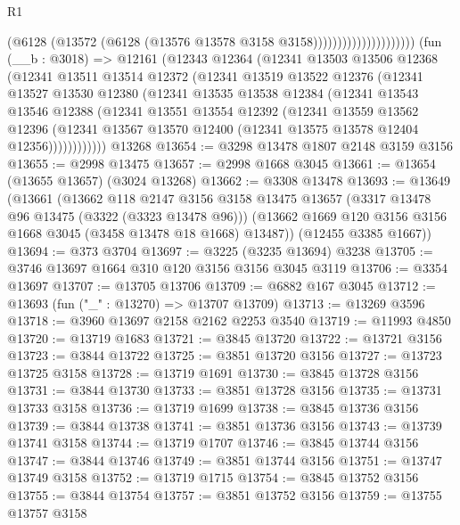 \begin{lexlean}{R1}
\begin{coremodule}
                                      (@6128
                                        (@13572
                                          (@6128 (@13576 @13578 @3158 @3158)))))))))))))))))))))
    (fun (__b : @3018) =>
    @12161
      (@12343
        @12364
        (@12341
          @13503
          @13506
          @12368
          (@12341
            @13511
            @13514
            @12372
            (@12341
              @13519
              @13522
              @12376
              (@12341
                @13527
                @13530
                @12380
                (@12341
                  @13535
                  @13538
                  @12384
                  (@12341
                    @13543
                    @13546
                    @12388
                    (@12341
                      @13551
                      @13554
                      @12392
                      (@12341
                        @13559
                        @13562
                        @12396
                        (@12341 @13567 @13570 @12400 (@12341 @13575 @13578 @12404 @12356))))))))))))
    @13268
@13654 := @3298 @13478 @1807 @2148 @3159 @3156
@13655 := @2998 @13475
@13657 := @2998 @1668 @3045
@13661 := @13654 (@13655 @13657) (@3024 @13268)
@13662 := @3308 @13478
@13693 := @13649
    (@13661
      (@13662
        @118
        @2147
        @3156
        @3158
        @13475
        @13657
        (@3317 @13478 @96 @13475 (@3322 (@3323 @13478 @96)))
        (@13662 @1669 @120 @3156 @3156 @1668 @3045 (@3458 @13478 @18 @1668) @13487))
      (@12455 @3385 @1667))
@13694 := @373 @3704
@13697 := @3225 (@3235 @13694) @3238
@13705 := @3746 @13697 @1664 @310 @120 @3156 @3156 @3045 @3119
@13706 := @3354 @13697
@13707 := @13705 @13706
@13709 := @6882 @167 @3045
@13712 := @13693 (fun ("_" : @13270) => @13707 @13709)
@13713 := @13269 @3596
@13718 := @3960 @13697 @2158 @2162 @2253 @3540
@13719 := @11993 @4850
@13720 := @13719 @1683
@13721 := @3845 @13720
@13722 := @13721 @3156
@13723 := @3844 @13722
@13725 := @3851 @13720 @3156
@13727 := @13723 @13725 @3158
@13728 := @13719 @1691
@13730 := @3845 @13728 @3156
@13731 := @3844 @13730
@13733 := @3851 @13728 @3156
@13735 := @13731 @13733 @3158
@13736 := @13719 @1699
@13738 := @3845 @13736 @3156
@13739 := @3844 @13738
@13741 := @3851 @13736 @3156
@13743 := @13739 @13741 @3158
@13744 := @13719 @1707
@13746 := @3845 @13744 @3156
@13747 := @3844 @13746
@13749 := @3851 @13744 @3156
@13751 := @13747 @13749 @3158
@13752 := @13719 @1715
@13754 := @3845 @13752 @3156
@13755 := @3844 @13754
@13757 := @3851 @13752 @3156
@13759 := @13755 @13757 @3158

\end{coremodule}
\end{lexlean}
